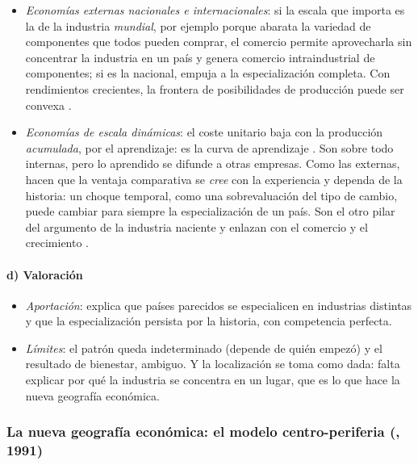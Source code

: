 \documentclass[11pt]{article}
\begin{document}
\begin{itemize}
\item \emph{Economías externas nacionales e internacionales}\nocite{Ethier1982National}: si la escala que importa es la de la industria \emph{mundial}, por ejemplo porque abarata la variedad de componentes que todos pueden comprar, el comercio permite aprovecharla sin concentrar la industria en un país y genera comercio intraindustrial de componentes; si es la nacional, empuja a la especialización completa. Con rendimientos crecientes, la frontera de posibilidades de producción puede ser convexa .
\item \emph{Economías de escala dinámicas}: el coste unitario baja con la producción \emph{acumulada}, por el aprendizaje: es la curva de aprendizaje . Son sobre todo internas, pero lo aprendido se difunde a otras empresas\nocite{Arrow1962Learning}. Como las externas, hacen que la ventaja comparativa se \emph{cree} con la experiencia y dependa de la historia: un choque temporal, como una sobrevaluación del tipo de cambio, puede cambiar para siempre la especialización de un país\nocite{Krugman1987Narrow}. Son el otro pilar del argumento de la industria naciente  y enlazan con el comercio y el crecimiento .
\end{itemize}

\paragraph{d) Valoración}

\begin{itemize}
\item \emph{Aportación}: explica que países parecidos se especialicen en industrias distintas y que la especialización persista por la historia, con competencia perfecta.
\item \emph{Límites}: el patrón queda indeterminado (depende de quién empezó) y el resultado de bienestar, ambiguo. Y la localización se toma como dada: falta explicar por qué la industria se concentra en un lugar, que es lo que hace la nueva geografía económica.
\end{itemize}

\subsubsection{La nueva geografía económica: el modelo centro-periferia (, 1991)}\label{sec:centro-periferia}
\end{document}
